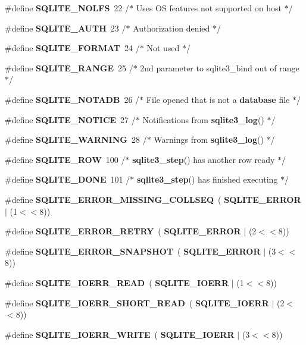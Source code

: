 \begin{DoxyCompactItemize}
\item 
\#define \textbf{ S\+Q\+L\+I\+T\+E\+\_\+\+N\+O\+L\+FS}~22   /$\ast$ Uses OS features not supported on host $\ast$/
\item 
\#define \textbf{ S\+Q\+L\+I\+T\+E\+\_\+\+A\+U\+TH}~23   /$\ast$ Authorization denied $\ast$/
\item 
\#define \textbf{ S\+Q\+L\+I\+T\+E\+\_\+\+F\+O\+R\+M\+AT}~24   /$\ast$ Not used $\ast$/
\item 
\#define \textbf{ S\+Q\+L\+I\+T\+E\+\_\+\+R\+A\+N\+GE}~25   /$\ast$ 2nd parameter to sqlite3\+\_\+bind out of range $\ast$/
\item 
\#define \textbf{ S\+Q\+L\+I\+T\+E\+\_\+\+N\+O\+T\+A\+DB}~26   /$\ast$ File opened that is not a \textbf{ database} file $\ast$/
\item 
\#define \textbf{ S\+Q\+L\+I\+T\+E\+\_\+\+N\+O\+T\+I\+CE}~27   /$\ast$ Notifications from \textbf{ sqlite3\+\_\+log}() $\ast$/
\item 
\#define \textbf{ S\+Q\+L\+I\+T\+E\+\_\+\+W\+A\+R\+N\+I\+NG}~28   /$\ast$ Warnings from \textbf{ sqlite3\+\_\+log}() $\ast$/
\item 
\#define \textbf{ S\+Q\+L\+I\+T\+E\+\_\+\+R\+OW}~100  /$\ast$ \textbf{ sqlite3\+\_\+step}() has another row ready $\ast$/
\item 
\#define \textbf{ S\+Q\+L\+I\+T\+E\+\_\+\+D\+O\+NE}~101  /$\ast$ \textbf{ sqlite3\+\_\+step}() has finished executing $\ast$/
\item 
\#define \textbf{ S\+Q\+L\+I\+T\+E\+\_\+\+E\+R\+R\+O\+R\+\_\+\+M\+I\+S\+S\+I\+N\+G\+\_\+\+C\+O\+L\+L\+S\+EQ}~(\textbf{ S\+Q\+L\+I\+T\+E\+\_\+\+E\+R\+R\+OR} $\vert$ (1$<$$<$8))
\item 
\#define \textbf{ S\+Q\+L\+I\+T\+E\+\_\+\+E\+R\+R\+O\+R\+\_\+\+R\+E\+T\+RY}~(\textbf{ S\+Q\+L\+I\+T\+E\+\_\+\+E\+R\+R\+OR} $\vert$ (2$<$$<$8))
\item 
\#define \textbf{ S\+Q\+L\+I\+T\+E\+\_\+\+E\+R\+R\+O\+R\+\_\+\+S\+N\+A\+P\+S\+H\+OT}~(\textbf{ S\+Q\+L\+I\+T\+E\+\_\+\+E\+R\+R\+OR} $\vert$ (3$<$$<$8))
\item 
\#define \textbf{ S\+Q\+L\+I\+T\+E\+\_\+\+I\+O\+E\+R\+R\+\_\+\+R\+E\+AD}~(\textbf{ S\+Q\+L\+I\+T\+E\+\_\+\+I\+O\+E\+RR} $\vert$ (1$<$$<$8))
\item 
\#define \textbf{ S\+Q\+L\+I\+T\+E\+\_\+\+I\+O\+E\+R\+R\+\_\+\+S\+H\+O\+R\+T\+\_\+\+R\+E\+AD}~(\textbf{ S\+Q\+L\+I\+T\+E\+\_\+\+I\+O\+E\+RR} $\vert$ (2$<$$<$8))
\item 
\#define \textbf{ S\+Q\+L\+I\+T\+E\+\_\+\+I\+O\+E\+R\+R\+\_\+\+W\+R\+I\+TE}~(\textbf{ S\+Q\+L\+I\+T\+E\+\_\+\+I\+O\+E\+RR} $\vert$ (3$<$$<$8))

\end{DoxyCompactItemize}

